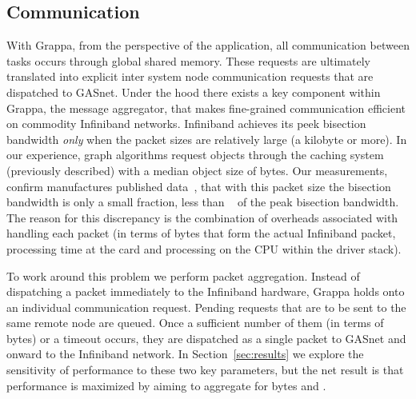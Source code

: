 \subsection{Communication}

With Grappa, from the perspective of the application, all communication between tasks occurs through global shared memory.  These requests are ultimately translated into explicit inter system node communication requests that are dispatched to GASnet.  Under the hood there exists a key component within Grappa, the message aggregator, that makes fine-grained communication efficient on commodity Infiniband networks.  Infiniband achieves its peek bisection bandwidth \emph{only} when the packet sizes are relatively large (a kilobyte or more).  In our experience, graph algorithms request objects through the caching system (previously described) with a median object size of  bytes.  Our measurements, confirm manufactures published data~\cite{infinibandbandwidth}, that with this packet size the bisection bandwidth is only a small fraction, less than ~ of the peak bisection bandwidth.  The reason for this discrepancy is the combination of overheads associated with handling each packet (in terms of bytes that form the actual Infiniband packet, processing time at the card and processing on the CPU within the driver stack).

To work around this problem we perform packet aggregation.  Instead of dispatching a packet immediately to the Infiniband hardware, Grappa holds onto an individual communication request.  Pending requests that are to be sent to the same remote node are queued.  Once a sufficient number of them (in terms of bytes) or a timeout occurs, they are dispatched as a single packet to GASnet and onward to the Infiniband network.  In Section~\ref{sec:results} we explore the sensitivity of performance to these two key parameters, but the net result is that performance is maximized by aiming to aggregate for  bytes and .
